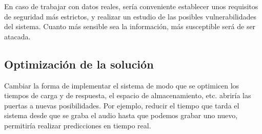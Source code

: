 En caso de trabajar con datos reales, sería conveniente establecer unos requisitos de seguridad más estrictos, y realizar un estudio de las posibles vulnerabilidades del sistema.
Cuanto más sensible sea la información, más susceptible será de ser atacada.

\subsection{Optimización de la solución}
Cambiar la forma de implementar el sistema de modo que se optimicen los tiempos de carga y de respuesta, el espacio de almacenamiento, etc. abriría las puertas a nuevas posibilidades.
Por ejemplo, reducir el tiempo que tarda el sistema desde que se graba el audio hasta que podemos grabar uno nuevo, permitiría realizar predicciones en tiempo real.





\endinput